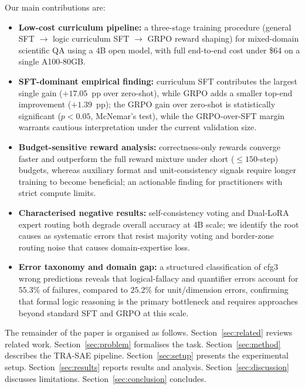 \documentclass{ieeeaccess}
\newcommand{\modelname}{\textsc{TRA-SAE}}
\begin{document}
Our main contributions are:
\begin{itemize}
  \item \textbf{Low-cost curriculum pipeline:} a three-stage training
        procedure (general SFT $\to$ logic curriculum SFT $\to$ GRPO
        reward shaping) for mixed-domain scientific QA using a 4B open
        model, with full end-to-end cost under \$64 on a single A100-80GB.

  \item \textbf{SFT-dominant empirical finding:} curriculum SFT contributes
        the largest single gain ($+17.05$~pp over zero-shot), while GRPO
        adds a smaller top-end improvement ($+1.39$~pp); the GRPO gain over
        zero-shot is statistically significant ($p < 0.05$, McNemar's test),
        while the GRPO-over-SFT margin warrants cautious interpretation under
        the current validation size.

  \item \textbf{Budget-sensitive reward analysis:} correctness-only rewards
        converge faster and outperform the full reward mixture under short
        (${\le}150$-step) budgets, whereas auxiliary format and
        unit-consistency signals require longer training to become beneficial;
        an actionable finding for practitioners with strict compute limits.

  \item \textbf{Characterised negative results:} self-consistency voting and
        Dual-LoRA expert routing both degrade overall accuracy at 4B scale;
        we identify the root causes as systematic errors that resist majority
        voting and border-zone routing noise that causes domain-expertise loss.

  \item \textbf{Error taxonomy and domain gap:} a structured classification
        of cfg3 wrong predictions reveals that logical-fallacy and quantifier
        errors account for $55.3\%$ of failures, compared to $25.2\%$ for
        unit/dimension errors, confirming that formal logic reasoning is the
        primary bottleneck and requires approaches beyond standard SFT and
        GRPO at this scale.
\end{itemize}

The remainder of the paper is organised as follows.
Section~\ref{sec:related} reviews related work.
Section~\ref{sec:problem} formalises the task.
Section~\ref{sec:method} describes the \modelname{} pipeline.
Section~\ref{sec:setup} presents the experimental setup.
Section~\ref{sec:results} reports results and analysis.
Section~\ref{sec:discussion} discusses limitations.
Section~\ref{sec:conclusion} concludes.
\end{document}
